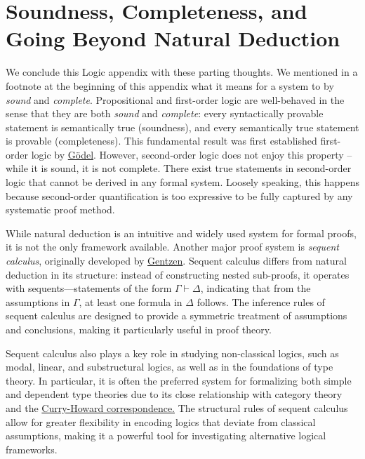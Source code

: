 \section{Soundness, Completeness, and Going Beyond Natural Deduction}

We conclude this Logic appendix with these parting thoughts. We mentioned in a footnote at the beginning of this appendix what it means for a system to by \textit{sound} and \textit{complete}. 
Propositional and first-order logic are well-behaved in the sense that they are both \textit{sound} and \textit{complete}: every syntactically provable statement is semantically true (soundness), 
and every semantically true statement is provable (completeness). This fundamental result was first established first-order logic by \href{https://en.wikipedia.org/wiki/Kurt_G%C3%B6del}{G\"{o}del}. However, second-order logic does not enjoy this property -- while it is sound, it is not complete. There exist 
true statements in second-order logic that cannot be derived in any formal system. Loosely speaking, this happens because second-order quantification is too expressive to be fully captured 
by any systematic proof method.

While natural deduction is an intuitive and widely used system for formal proofs, it is not the only framework available. Another major proof system is \textit{sequent calculus}, 
originally developed by \href{https://en.wikipedia.org/wiki/Gerhard_Gentzen}{Gentzen}. Sequent calculus differs from natural deduction in its structure: instead of constructing nested sub-proofs, 
it operates with sequents—statements of the form \( \Gamma \vdash \Delta \), indicating that from the assumptions in \( \Gamma \), at least one formula in \( \Delta \) follows. The inference 
rules of sequent calculus are designed to provide a symmetric treatment of assumptions and conclusions, making it particularly useful in proof theory.

Sequent calculus also plays a key role in studying non-classical logics, such as modal, linear, and substructural logics, as well as in the foundations of type theory. In particular, it is 
often the preferred system for formalizing both simple and dependent type theories due to its close relationship with category theory and the \href{https://en.wikipedia.org/wiki/Curry%E2%80%93Howard_correspondence}{Curry-Howard correspondence.} The structural rules 
of sequent calculus allow for greater flexibility in encoding logics that deviate from classical assumptions, making it a powerful tool for investigating alternative logical frameworks.

